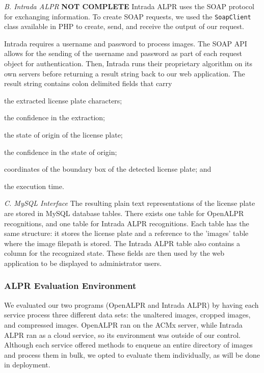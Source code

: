 \documentclass[11pt, oneside, fullpage, doublespace]{article}
\begin{document}
\emph{B. Intrada ALPR}
{\color{red}\textbf{NOT COMPLETE}}
Intrada ALPR uses the SOAP protocol for exchanging information. To create SOAP requests, we used the \verb+SoapClient+ class available in PHP to create, send, and receive the output of our request.

Intrada requires a username and password to process images. The SOAP API allows for the sending of the username and password as part of each request object for authentication. Then, Intrada runs their proprietary algorithm on its own servers before returning a result string back to our web application. The result string contains colon delimited fields that carry 
\begin{inparaenum}
\item the extracted license plate characters;
\item the confidence in the extraction;
\item the state of origin of the license plate;
\item the confidence in the state of origin;
\item coordinates of the boundary box of the detected license plate; and
\item the execution time.
\end{inparaenum}

\emph{C. MySQL Interface}
The resulting plain text representations of the license plate are stored in MySQL database tables. There exists one table for OpenALPR recognitions, and one table for Intrada ALPR recognitions. Each table has the same structure: it stores the license plate and a reference to the 'images' table where the image filepath is stored. The Intrada ALPR table also contains a column for the recognized state. These fields are then used by the web application to be displayed to administrator users.

\subsubsection{ALPR Evaluation Environment}
We evaluated our two programs (OpenALPR and Intrada ALPR) by having each service process three different data sets: the unaltered images, cropped images, and compressed images. OpenALPR ran on the ACMx server, while Intrada ALPR ran as a cloud service, so its environment was outside of our control. Although each service offered methods to enqueue an entire directory of images and process them in bulk, we opted to evaluate them individually, as will be done in deployment.
\end{document}

